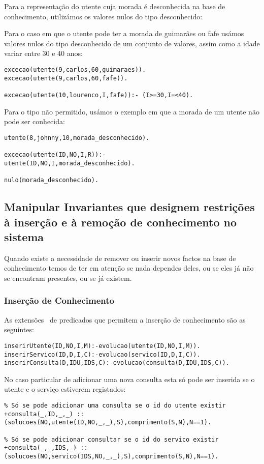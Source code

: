 Para a representação do utente cuja morada é desconhecida na base de conhecimento, utilizámos os valores nulos do tipo desconhecido: 



Para o caso em que o utente pode ter a morada de guimarães ou fafe  usámos valores nulos do tipo desconhecido de um conjunto de valores, assim como a idade variar entre 30 e 40 anos: 

\begin{Verbatim}
excecao(utente(9,carlos,60,guimaraes)).
excecao(utente(9,carlos,60,fafe)).

excecao(utente(10,lourenco,I,fafe)):- (I>=30,I=<40).	
\end{Verbatim}

Para o tipo não permitido, usámos o exemplo em que a morada de um utente não pode ser conhecida: 

\begin{verbatim}
utente(8,johnny,10,morada_desconhecido).

excecao(utente(ID,NO,I,R)):- 
utente(ID,NO,I,morada_desconhecido).

nulo(morada_desconhecido).
\end{verbatim}


\subsection{Manipular Invariantes que designem restrições à inserção e à remoção de conhecimento no sistema}

Quando existe a necessidade de remover ou inserir novos factos na base de conhecimento temos de ter em atenção se nada dependes deles, ou se eles já não se encontram presentes, ou se já existem. 

\subsubsection{Inserção de Conhecimento}
As extensões ~de predicados que permitem a inserção de conhecimento são as seguintes: 
\begin{verbatim}
inserirUtente(ID,NO,I,M):-evolucao(utente(ID,NO,I,M)).
inserirServico(ID,D,I,C):-evolucao(servico(ID,D,I,C)).
inserirConsulta(D,IDU,IDS,C):-evolucao(consulta(D,IDU,IDS,C)).
\end{verbatim}
No caso particular de adicionar uma nova consulta esta só pode ser inserida se o utente e o serviço estiverem registados: 
\begin{verbatim}
% Só se pode adicionar uma consulta se o id do utente existir 
+consulta(_,ID,_,_) ::
(solucoes(NO,utente(ID,NO,_,_),S),comprimento(S,N),N==1).

% Só se pode adicionar consultar se o id do servico existir
+consulta(_,_,IDS,_) ::
(solucoes(NO,servico(IDS,NO,_,_),S),comprimento(S,N),N==1).
\end{verbatim}

